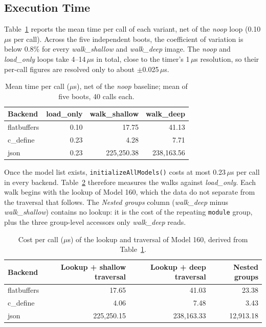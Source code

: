 \documentclass{article}
\begin{document}
\subsection{Execution Time}
Table~\ref{tab:timing} reports the mean time per call of each variant, net of the \textit{noop} loop (0.10\,$\mu$s per call). Across the five independent boots, the coefficient of variation is below 0.8\% for every \textit{walk\_shallow} and \textit{walk\_deep} image. The \textit{noop} and \textit{load\_only} loops take 4--14\,$\mu$s in total, close to the timer's 1\,$\mu$s resolution, so their per-call figures are resolved only to about $\pm$0.025\,$\mu$s.

\begin{table}[h]
\centering
\begin{tabular}{|l|r|r|r|}
\hline
\textbf{Backend} & \textbf{load\_only} & \textbf{walk\_shallow} & \textbf{walk\_deep} \\
\hline
flatbuffers & 0.10 & 17.75        & 41.13        \\
c\_define   & 0.23 & 4.28         & 7.71         \\
json        & 0.23 & 225{,}250.38 & 238{,}163.56 \\
\hline
\end{tabular}
\caption{Mean time per call ($\mu$s), net of the \textit{noop} baseline; mean of five boots, 40 calls each.}
\label{tab:timing}
\end{table}

Once the model list exists, \texttt{initializeAllModels()} costs at most 0.23\,$\mu$s per call in every backend. Table~\ref{tab:decomposition} therefore measures the walks against \textit{load\_only}. Each walk begins with the lookup of Model 160, which the data do not separate from the traversal that follows. The \textit{Nested groups} column (\textit{walk\_deep} minus \textit{walk\_shallow}) contains no lookup: it is the cost of the repeating \texttt{module} group, plus the three group-level accessors only \textit{walk\_deep} reads.

\begin{table}[h]
\centering
\begin{tabular}{|l|r|r|r|}
\hline
\textbf{Backend} & \textbf{Lookup + shallow traversal} & \textbf{Lookup + deep traversal} & \textbf{Nested groups} \\
\hline
flatbuffers & 17.65        & 41.03        & 23.38       \\
c\_define   & 4.06         & 7.48         & 3.43        \\
json        & 225{,}250.15 & 238{,}163.33 & 12{,}913.18 \\
\hline
\end{tabular}
\caption{Cost per call ($\mu$s) of the lookup and traversal of Model 160, derived from Table~\ref{tab:timing}.}
\label{tab:decomposition}
\end{table}
\end{document}
